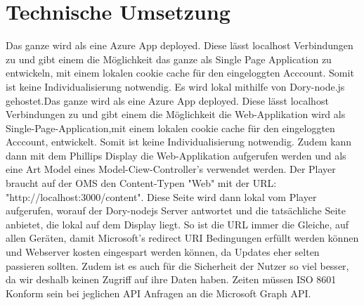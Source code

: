 
\section{Technische Umsetzung}
Das ganze wird als eine Azure App deployed. Diese lässt localhost Verbindungen zu und gibt einem die Möglichkeit das ganze als Single Page Application zu entwickeln, mit einem lokalen cookie cache für den eingeloggten Acccount. Somit ist keine Individualisierung notwendig.
\newline
Es wird lokal mithilfe von Dory-node.js gehostet.Das ganze wird als eine Azure App deployed. Diese lässt localhost Verbindungen zu und gibt einem die Möglichkeit die Web-Applikation wird als Single-Page-Application,mit einem lokalen cookie cache für den eingeloggten Acccount, entwickelt. Somit ist keine Individualisierung notwendig.
Zudem kann dann mit dem Phillips Display die Web-Applikation aufgerufen werden und als eine Art Model eines Model-Ciew-Controller's verwendet werden.
\newline
Der Player braucht auf der OMS den Content-Typen "Web" mit der URL: "http://localhost:3000/content". Diese Seite wird dann lokal vom Player aufgerufen, worauf der Dory-nodejs Server antwortet und die tatsächliche Seite anbietet, die lokal auf dem Display liegt. So ist die URL immer die Gleiche, auf allen Geräten, damit Microsoft's redirect URI Bedingungen erfüllt werden können und Webserver kosten eingespart werden können, da Updates eher selten passieren sollten.
\newline
Zudem ist es auch für die Sicherheit der Nutzer so viel besser, da wir deshalb keinen Zugriff auf ihre Daten haben.
Zeiten müssen ISO 8601 Konform sein bei jeglichen API Anfragen an die Microsoft Graph API.